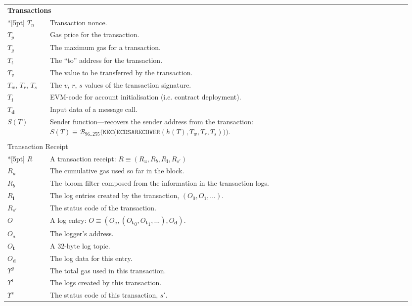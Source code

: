 \documentclass[9pt,oneside]{amsart}
\begin{document}
\begin{longtable}{p{0.10\linewidth}p{0.85\linewidth}}
\vspace{5pt} \\
\midrule
\multicolumn{2}{l}{\textbf{Transactions}} \\*[5pt]
$T_n$ & Transaction nonce. \\
$T_p$ & Gas price for the transaction. \\
$T_g$ & The maximum gas for a transaction. \\
$T_t$ & The ``to'' address for the transaction. \\
$T_v$ & The value to be transferred by the transaction. \\
$T_w$, $T_r$, $T_s$ & The $v$, $r$, $s$ values of the transaction signature. \\
$T_\mathbf{i}$ & EVM-code for account initialisation (i.e. contract deployment). \\
$T_\mathbf{d}$ & Input data of a message call. \\
$S(T)$ & Sender function---recovers the sender address from the transaction: \newline $S(T) \equiv \mathcal{B}_{96..255}\big(\mathtt{KEC}\big( \mathtt{ECDSARECOVER}(h(T), T_w, T_r, T_s) \big) \big).$ \\

\vspace{5pt} \\
\multicolumn{2}{l}{Transaction Receipt} \\*[5pt]
$R$ & A transaction receipt: $R \equiv (R_u, R_b, R_\mathbf{l}, R_{s'})$ \\
$R_u$ & The cumulative gas used so far in the block. \\
$R_b$ & The bloom filter composed from the information in the transaction logs. \\
$R_\mathbf{l}$ & The log entries created by the transaction, $(O_0, O_1, ...)$. \\
$R_{s'}$ & The status code of the transaction. \\
$O$ & A log entry: $O \equiv (O_a, ({O_\mathbf{t}}_0, {O_\mathbf{t}}_1, ...), O_\mathbf{d})$. \\
$O_a$ & The logger's address. \\
$O_\mathbf{t}$ & A 32-byte log topic. \\
$O_\mathbf{d}$ & The log data for this entry. \\

$\Upsilon^g$ & The total gas used in this transaction. \\
$\Upsilon^\mathbf{l}$ & The logs created by this transaction. \\
$\Upsilon^s$ & The status code of this transaction, $s'$. \\


\end{longtable}
\end{document}
